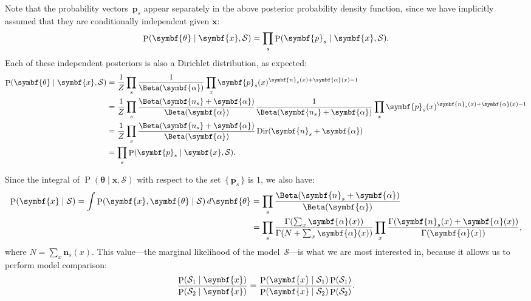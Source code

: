 \documentclass[12pt,a4paper]{article}
\newcommand\mc[1]{\mathcal{#1}}               %
\newcommand\ub[1]{\symbf{#1}}                 %
\DeclareMathOperator\Pb{P}                    %
\DeclarePairedDelimiter\lr{\lparen}{\rparen}  %
\DeclareMathOperator\dir{Dir} %
\begin{document}
Note that the probability vectors~\(\ub{p}_s\) appear separately in the above
posterior probability density function, since we have implicitly assumed that
they are conditionally independent given \(\ub{x}\):
\begin{equation*}
  \Pb\lr{\ub{\theta} \mid \ub{x}, \mc{S}} =
    \prod_s \Pb\lr{\ub{p}_s \mid \ub{x}, \mc{S}}.
\end{equation*}
Each of these independent posteriors is also a Dirichlet distribution, as
expected:
\begin{align*}
  \Pb\lr{\ub{\theta} \mid \ub{x}, \mc{S}} &=
    \frac{1}{Z} \prod_s \frac{1}{\Beta\lr{\ub{\alpha}}}
    \prod_x \ub{p}_s(x)^{\ub{n}_s(x)+\ub{\alpha}(x)-1} \\
  &= \frac{1}{Z} \prod_s \frac{\Beta\lr{\ub{n_s} + \ub{\alpha}}}
    {\Beta\lr{\ub{\alpha}}} \frac{1}{\Beta\lr{\ub{n_s} + \ub{\alpha}}}
    \prod_x \ub{p}_s(x)^{\ub{n}_s(x)+\ub{\alpha}(x)-1} \\
  &= \frac{1}{Z} \prod_s \frac{\Beta\lr{\ub{n_s} + \ub{\alpha}}}
    {\Beta\lr{\ub{\alpha}}} \dir\lr{\ub{n}_s + \ub{\alpha}} \\
  &= \prod_s \Pb\lr{\ub{p}_s \mid \ub{x}, \mc{S}}.
\end{align*}

Since the integral of \(\Pb(\ub{\theta} \mid \ub{x}, \mc{S})\) with respect to
the set~\(\{\,\ub{p}_s\,\}\) is \(1\), we also have:
\begin{align*}
  \Pb\lr{\ub{x} \mid \mc{S}} =
  \int \Pb\lr{\ub{x}, \ub{\theta} \mid \mc{S}}\, d\ub{\theta}
  &= \prod_s \frac{\Beta\lr{\ub{n}_s + \ub{\alpha}}}{\Beta\lr{\ub{\alpha}}} \\
  &= \prod_s \frac{\Gamma\lr*{\sum_x \ub{\alpha}(x)}}
    {\Gamma\lr*{N + \sum_x \ub{\alpha}(x)}} \prod_x
    \frac{\Gamma\lr{\ub{n}_s(x) + \ub{\alpha}(x)}}{\Gamma\lr{\ub{\alpha}(x)}},
\end{align*}
where \(N = \sum_x \ub{n}_s(x)\). This value---the marginal likelihood of the
model~\(\mc{S}\)---is what we are most interested in, because it allows us to
perform model comparison:
\begin{equation}\label{eqn:model comparison}
  \frac{\Pb\lr{\mc{S}_1 \mid \ub{x}}}{\Pb\lr{\mc{S}_2 \mid \ub{x}}} =
    \frac{\Pb\lr{\ub{x} \mid \mc{S}_1} \Pb\lr{\mc{S}_1}}
    {\Pb\lr{\ub{x} \mid \mc{S}_2} \Pb\lr{\mc{S}_2}}.
\end{equation}
\end{document}
